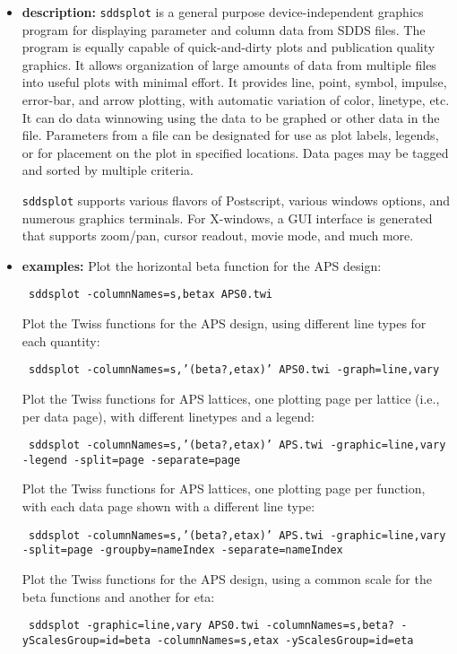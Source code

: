 \begin{itemize}
\item {\bf description:}
{\tt sddsplot} is a general purpose device-independent graphics program for displaying parameter and column data
from SDDS files.  The program is equally capable of quick-and-dirty plots and publication quality graphics.  It
allows organization of large amounts of data from multiple files into useful plots with minimal effort.  It
provides line, point, symbol, impulse, error-bar, and arrow plotting, with automatic variation of color, linetype,
etc.  It can do data winnowing using the data to be graphed or other data in the file.  Parameters from a file can
be designated for use as plot labels, legends, or for placement on the plot in specified locations.  Data pages may
be tagged and sorted by multiple criteria.

{\tt sddsplot} supports various flavors of Postscript, various windows options, and numerous graphics terminals.  For
X-windows, a GUI interface is generated that supports zoom/pan, cursor readout, movie mode, and much more.

\item {\bf examples:} 
Plot the horizontal beta function for the APS design:
\begin{flushleft}{\tt 
sddsplot -columnNames=s,betax APS0.twi
}
\end{flushleft}
Plot the Twiss functions for the APS design, using different line types for
each quantity:
\begin{flushleft}{\tt 
sddsplot -columnNames=s,'(beta?,etax)' APS0.twi -graph=line,vary 
}
\end{flushleft}
Plot the Twiss functions for APS lattices, one plotting page per lattice (i.e., per
data page), with different linetypes and a legend:
\begin{flushleft}{\tt 
sddsplot -columnNames=s,'(beta?,etax)' APS.twi -graphic=line,vary -legend
        -split=page -separate=page
}\end{flushleft}
Plot the Twiss functions for APS lattices, one plotting page per function, with each 
data page shown with a different line type:
\begin{flushleft}{\tt 
sddsplot -columnNames=s,'(beta?,etax)' APS.twi -graphic=line,vary
        -split=page -groupby=nameIndex -separate=nameIndex
}
\end{flushleft}
Plot the Twiss functions for the APS design, using a common scale for the beta functions
and another for eta:
\begin{flushleft}{\tt
sddsplot -graphic=line,vary APS0.twi -columnNames=s,beta? -yScalesGroup=id=beta 
-columnNames=s,etax -yScalesGroup=id=eta
}


\end{flushleft}
\end{itemize}
